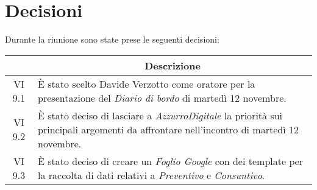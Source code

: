 

\section{Decisioni}

Durante la riunione sono state prese le seguenti decisioni:

\vspace{0.5cm}

\begin{table}[htbp]
    \centering
    \begin{tabular}{|c|p{}|}
        \hline
        \rowcolor[gray]{0.75}
        \multicolumn{1}{|c|}{\textbf{Codice}} & \multicolumn{1}{|c|}{\textbf{Descrizione}}\\
        \hline
        VI 9.1 & È stato scelto Davide Verzotto come oratore per la presentazione del \emph{Diario di bordo} di martedì 12 novembre.\\
        \hline
        VI 9.2 & È stato deciso di lasciare a \emph{AzzurroDigitale} la priorità sui principali argomenti da affrontare nell'incontro di martedì 12 novembre. \\   
        \hline
        VI 9.3 & È stato deciso di creare un \emph{Foglio Google} con dei template per la raccolta di dati relativi a \emph{Preventivo} e \emph{Consuntivo}.\\
        \hline
    \end{tabular}
\end{table}